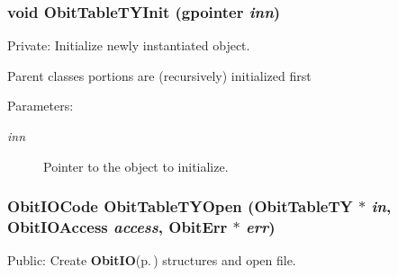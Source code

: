 \subsubsection{\setlength{\rightskip}{0pt plus 5cm}void Obit\-Table\-TYInit (gpointer {\em inn})}\label{ObitTableTY_8c_a8}


Private: Initialize newly instantiated object. 

Parent classes portions are (recursively) initialized first \begin{Desc}
\item[Parameters:]
\begin{description}
\item[{\em inn}]Pointer to the object to initialize. \end{description}
\end{Desc}
\subsubsection{\setlength{\rightskip}{0pt plus 5cm}Obit\-IOCode Obit\-Table\-TYOpen ({\bf Obit\-Table\-TY} $\ast$ {\em in}, Obit\-IOAccess {\em access}, {\bf Obit\-Err} $\ast$ {\em err})}\label{ObitTableTY_8c_a21}


Public: Create {\bf Obit\-IO}{\rm (p.\,\pageref{structObitIO})} structures and open file. 


